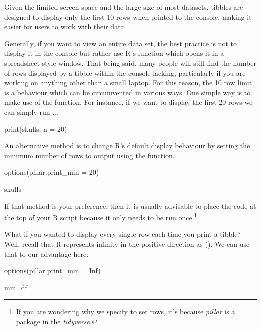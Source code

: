 Given the limited screen space and the large size of most datasets, tibbles are designed to display only the first 10 rows when printed to the console, making it easier for users to work with their data.

Generally, if you want to view an entire data set, the best practice is not to display it in the console but rather use R's  function which opens it in a spreadsheet-style window. That being said, many people will still find the number of rows displayed by a tibble within the console lacking, particularly if you are working on anything other than a small laptop. For this reason, the 10 row limit is a behaviour which can be circumvented in various ways. One simple way is to make use of the  function. For instance, if we want to display the first 20 rows we can simply run ...

\begin{inR}
print(skulls, n = 20)
\end{inR}

\vspace{1em}

An alternative method is to change R's default display behaviour by setting the minimum number of rows to output using the  function.

\begin{inR}
options(pillar.print_min = 20)

skulls
\end{inR}

\vspace{1em}

\noindent
If that method is your preference, then it is usually advisable to place the  code at the top of your R script because it only needs to be run once.\footnote{If you are wondering why we specify  to set rows, it's because \textit{pillar} is a package in the \textit{tidyverse}.}

What if you wanted to display every single row each time you print a tibble? Well, recall that R represents infinity in the positive direction as (). We can use that to our advantage here:

\begin{inR}
options(pillar.print_min = Inf)

mm_df
\end{inR}

\vspace{1em}

